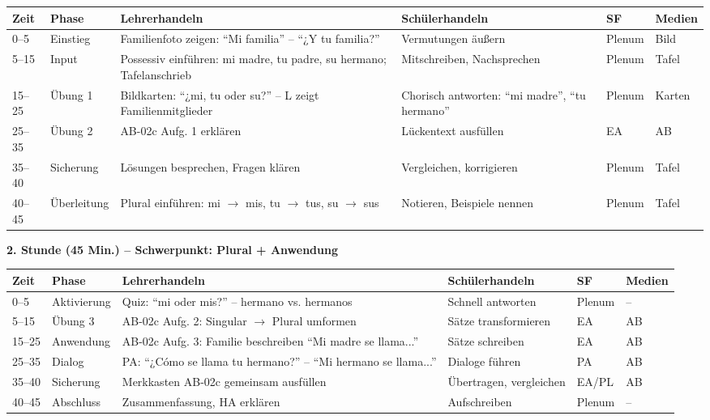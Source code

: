 \documentclass[11pt,a4paper]{article}
\begin{document}
\begin{longtable}{|p{1cm}|p{1.5cm}|p{4cm}|p{3cm}|p{2cm}|p{2cm}|}
\hline
\textbf{Zeit} & \textbf{Phase} & \textbf{Lehrerhandeln} & \textbf{Schülerhandeln} & \textbf{SF} & \textbf{Medien} \\
\hline
\endhead

0--5 & Einstieg & Familienfoto zeigen: ``Mi familia'' -- ``¿Y tu familia?'' & Vermutungen äußern & Plenum & Bild \\
\hline

5--15 & Input & Possessiv einführen: mi madre, tu padre, su hermano; Tafelanschrieb & Mitschreiben, Nachsprechen & Plenum & Tafel \\
\hline

15--25 & Übung 1 & Bildkarten: ``¿mi, tu oder su?'' -- L zeigt Familienmitglieder & Chorisch antworten: ``mi madre'', ``tu hermano'' & Plenum & Karten \\
\hline

25--35 & Übung 2 & AB-02c Aufg. 1 erklären & Lückentext ausfüllen & EA & AB \\
\hline

35--40 & Sicherung & Lösungen besprechen, Fragen klären & Vergleichen, korrigieren & Plenum & Tafel \\
\hline

40--45 & Überleitung & Plural einführen: mi $\rightarrow$ mis, tu $\rightarrow$ tus, su $\rightarrow$ sus & Notieren, Beispiele nennen & Plenum & Tafel \\
\hline
\end{longtable}

\vspace{1em}

\textbf{2. Stunde (45 Min.) -- Schwerpunkt: Plural + Anwendung}

\begin{longtable}{|p{1cm}|p{1.5cm}|p{4cm}|p{3cm}|p{2cm}|p{2cm}|}
\hline
\textbf{Zeit} & \textbf{Phase} & \textbf{Lehrerhandeln} & \textbf{Schülerhandeln} & \textbf{SF} & \textbf{Medien} \\
\hline
\endhead

0--5 & Aktivierung & Quiz: ``mi oder mis?'' -- hermano vs. hermanos & Schnell antworten & Plenum & -- \\
\hline

5--15 & Übung 3 & AB-02c Aufg. 2: Singular $\rightarrow$ Plural umformen & Sätze transformieren & EA & AB \\
\hline

15--25 & Anwendung & AB-02c Aufg. 3: Familie beschreiben ``Mi madre se llama...'' & Sätze schreiben & EA & AB \\
\hline

25--35 & Dialog & PA: ``¿Cómo se llama tu hermano?'' -- ``Mi hermano se llama...'' & Dialoge führen & PA & AB \\
\hline

35--40 & Sicherung & Merkkasten AB-02c gemeinsam ausfüllen & Übertragen, vergleichen & EA/PL & AB \\
\hline

40--45 & Abschluss & Zusammenfassung, HA erklären & Aufschreiben & Plenum & -- \\
\hline
\end{longtable}
\end{document}
